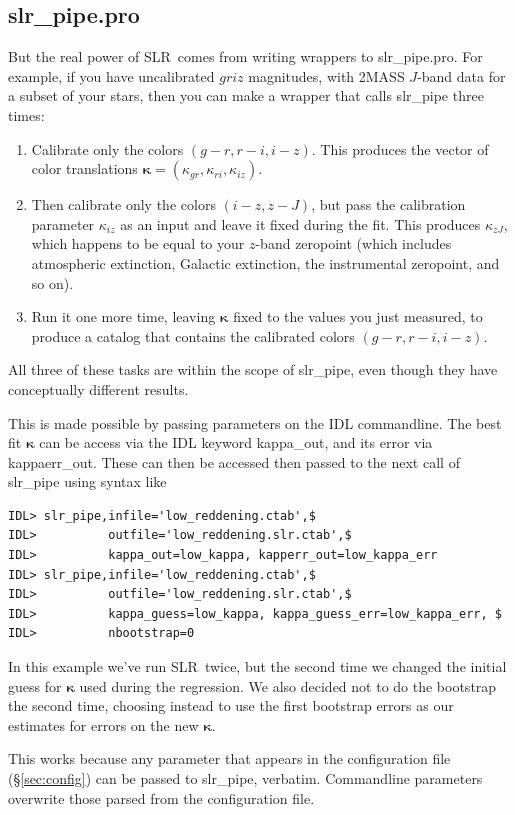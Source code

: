 \documentclass{report}
\newcommand{\zptcolor}{\boldsymbol{\kappa}}
\newcommand{\slr}{SLR}
\begin{document}
\subsection{slr\_pipe.pro}

But the real power of \slr\ comes from writing wrappers to
slr\_pipe.pro.  For example, if you have uncalibrated $griz$
magnitudes, with 2MASS $J$-band data for a subset of your stars, then
you can make a wrapper that calls slr\_pipe three times:
\begin{enumerate}
\item Calibrate only the colors $(g-r,r-i,i-z)$.  This produces the
  vector of color translations
  $\zptcolor=(\kappa_{gr},\kappa_{ri},\kappa_{iz})$.
\item Then calibrate only the colors $(i-z,z-J)$, but pass the
  calibration parameter $\kappa_{iz}$ as an input and leave it fixed
  during the fit. This produces $\kappa_{zJ}$, which happens to be
  equal to your $z$-band zeropoint (which includes atmospheric
  extinction, Galactic extinction, the instrumental zeropoint, and so
  on).
\item Run it one more time, leaving $\zptcolor$ fixed to the values
  you just measured, to produce a catalog that contains the calibrated
  colors $(g-r,r-i,i-z)$.
\end{enumerate}
All three of these tasks are within the scope of slr\_pipe, even
though they have conceptually different results.

This is made possible by passing parameters on the IDL commandline.
The best fit $\zptcolor$ can be access via the IDL keyword kappa\_out,
and its error via kappaerr\_out.  These can then be accessed then
passed to the next call of slr\_pipe using syntax like
\begin{verbatim}
IDL> slr_pipe,infile='low_reddening.ctab',$
IDL>          outfile='low_reddening.slr.ctab',$
IDL>          kappa_out=low_kappa, kapperr_out=low_kappa_err
IDL> slr_pipe,infile='low_reddening.ctab',$
IDL>          outfile='low_reddening.slr.ctab',$
IDL>          kappa_guess=low_kappa, kappa_guess_err=low_kappa_err, $
IDL>          nbootstrap=0
\end{verbatim}
In this example we've run \slr\ twice, but the second time we changed
the initial guess for $\zptcolor$ used during the regression.  We also
decided not to do the bootstrap the second time, choosing instead to
use the first bootstrap errors as our estimates for errors on the new
$\zptcolor$.

This works because any parameter that appears in the configuration
file (\S\ref{sec:config}) can be passed to slr\_pipe, verbatim.
Commandline parameters overwrite those parsed from the configuration
file.
\end{document}

